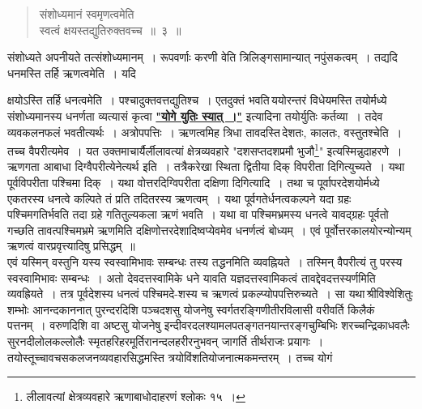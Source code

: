 \documentclass[11pt, openany]{book}
\begin{document}
 \label{1.3}
\begin{quote}
    \bs
     संशोध्यमानं स्वमृणत्वमेति \\
  
  \vspace{-7mm}
\hspace{1cm} स्वत्वं क्षयस्तद्युतिरुक्तवच्च~॥~३~॥

\end{quote}

 संशोध्यते अपनीयते तत्संशोध्यमानम्~। रूपवर्णाः करणी वेति 
त्रिलिङ्गसामान्यात् नपुंसकत्वम्~। तद्यदि धनमस्ति तर्हि ऋणत्वमेति~। यदि

\newpage

\noindent क्षयोऽस्ति तर्हि धनत्वमेति~। पश्चादुक्तवत्तद्युतिश्च~। एतदुक्तं भवति\textendash \,ययोरन्तरं विधेयमस्ति तयोर्मध्ये संशोध्यमानस्य धनर्णता व्यत्यासं कृत्वा \hyperref[1.3.1]{\textbf{"योगे युतिः स्यात्~।"}} इत्यादिना तयोर्युतिः कर्तव्या~। तदेव व्यवकलनफलं भवतीत्यर्थः~। अत्रोपपत्तिः~। ऋणत्वमिह त्रिधा तावदस्ति\textendash \,देशतः, कालतः, वस्तुतश्चेति~। तच्च वैपरीत्यमेव~। यत उक्तमाचार्यै{\qt र्लीलावत्यां क्षेत्रव्यवहारे "दशसप्तदशप्रमौ भुजौ\renewcommand{\thefootnote}{*}\footnote{लीलावत्यां क्षेत्रव्यवहारे ऋणाबाधोदाहरणं श्लोकः १५~।}"} इत्यस्मिन्नुदाहरणे~। ऋणगता आबाधा दिग्वैपरीत्येनेत्यर्थ इति~। तत्रैकरेखा स्थिता द्वितीया दिक् विपरीता दिगित्युच्यते~। 
यथा पूर्वविपरीता पश्चिमा दिक्~। यथा वोत्तरदिग्विपरीता दक्षिणा दिगित्यादि~। तथा च पूर्वापरदेशयोर्मध्ये एकतरस्य धनत्वे कल्पिते तं प्रति तदितरस्य ऋणत्वम्~। यथा पूर्वगतेर्धनत्वकल्पने यदा ग्रहः पश्चिमगतिर्भवति तदा ग्रहे गतितुल्यकला ऋणं भवति~। यथा वा पश्चिमभ्रमस्य धनत्वे यावद्ग्रहः पूर्वतो गच्छति तावत्पश्चिमभ्रमे ऋणमिति दक्षिणोत्तरदेशादिष्वप्येवमेव धनर्णत्वं बोध्यम्~। एवं पूर्वोत्तरकालयोरन्योन्यम् ऋणत्वं वारप्रवृत्त्यादिषु प्रसिद्धम्~॥ \\

\vspace{-3mm}
 एवं यस्मिन् वस्तुनि यस्य स्वस्वामिभावः सम्बन्धः तस्य तद्धनमिति 
व्यवह्नियते~। तस्मिन् वैपरीत्यं तु परस्य स्वस्वामिभावः सम्बन्धः~। अतो 
देवदत्तस्वामिके धने यावति यज्ञदत्तस्वामिकत्वं तावद्देवदत्तस्यर्णमिति
व्यवह्रियते~। तत्र पूर्वदेशस्य धनत्वं पश्चिमदे-शस्य च ऋणत्वं प्रकल्प्योपपत्तिरुच्यते~।
सा यथा\textendash \,श्रीविश्वेशितुः शम्भोः आनन्दकाननात् पुरन्दरदिशि पञ्चदशसु योजनेषु स्वर्गतरङ्गिणीतीरविलासी वरीवर्ति किलैकं पत्तनम्~। वरुणदिशि वा अष्टसु योजनेषु इन्दीवरदलश्यामलपतङ्गतनयान्तरङ्गचुम्बिभिः शरच्चन्द्रिकाधवलैः सुरनदीलोलकल्लोलैः स्मृतहरिहरमूर्तिरानन्दलहरीरनुभवन् जागर्ति तीर्थराजः प्रयागः~। तयोस्तूच्चावचसकलजनव्यवहारसिद्धमस्ति त्रयोविंशतियोजनात्मकमन्तरम्~। तच्च योगं 
\newpage
\end{document}
